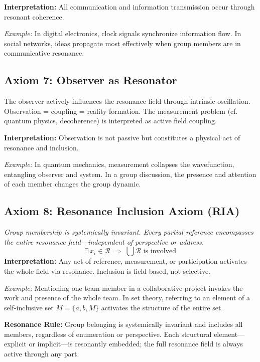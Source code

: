 \documentclass[12pt]{iopart}
\begin{document}
\textbf{Interpretation:} All communication and information transmission occur through resonant coherence.

\textit{Example:} In digital electronics, clock signals synchronize information flow. In social networks, ideas propagate most effectively when group members are in communicative resonance.

\subsection{Axiom 7: Observer as Resonator}
The observer actively influences the resonance field through intrinsic oscillation. Observation = coupling = reality formation. The measurement problem (cf. quantum physics, decoherence) is interpreted as active field coupling.

\textbf{Interpretation:} Observation is not passive but constitutes a physical act of resonance and inclusion.

\textit{Example:} In quantum mechanics, measurement collapses the wavefunction, entangling observer and system. In a group discussion, the presence and attention of each member changes the group dynamic.

\subsection{Axiom 8: Resonance Inclusion Axiom (RIA)}
\textit{Group membership is systemically invariant. Every partial reference encompasses the entire resonance field—independent of perspective or address.}
\[
\exists\, x_i \in \mathcal{R} \;\Rightarrow\; \bigcup \mathcal{R} \text{ is involved}
\]
\textbf{Interpretation:} Any act of reference, measurement, or participation activates the whole field via resonance. Inclusion is field-based, not selective.

\textit{Example:} Mentioning one team member in a collaborative project invokes the work and presence of the whole team. In set theory, referring to an element of a self-inclusive set $M = \{a, b, M\}$ activates the structure of the entire set.

\medskip

\textbf{Resonance Rule:}  
Group belonging is systemically invariant and includes all members, regardless of enumeration or perspective. Each structural element—explicit or implicit—is resonantly embedded; the full resonance field is always active through any part.

\medskip
\end{document}

